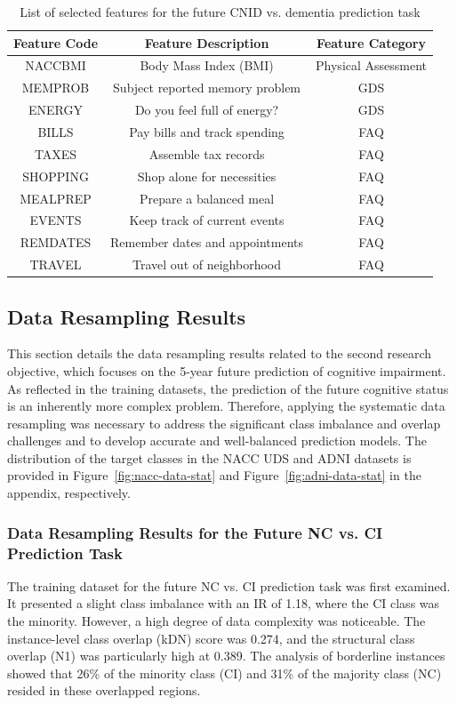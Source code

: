 \begin{table}[h!]
\centering
\caption{List of selected features for the future CNID vs. dementia prediction task}
\label{table:features-task4}
\begin{tabular}{ccc}
\toprule
\textbf{Feature Code} & \textbf{Feature Description} & \textbf{Feature Category} \\
\midrule
NACCBMI & Body Mass Index (\acrshort{BMI}) & Physical Assessment \\
MEMPROB & Subject reported memory problem & GDS \\
ENERGY & Do you feel full of energy? & GDS \\
BILLS & Pay bills and track spending & FAQ \\
TAXES & Assemble tax records & FAQ \\
SHOPPING & Shop alone for necessities & FAQ \\
MEALPREP & Prepare a balanced meal & FAQ \\
EVENTS & Keep track of current events & FAQ \\
REMDATES & Remember dates and appointments & FAQ \\
TRAVEL & Travel out of neighborhood & FAQ \\
\bottomrule
\end{tabular}
\end{table}


\subsection{Data Resampling Results}

\label{sec:resampling_results_ro2}
This section details the data resampling results related to the second research objective, which focuses on the 5-year future prediction of cognitive impairment. As reflected in the training datasets, the prediction of the future cognitive status is an inherently more complex problem. Therefore, applying the systematic data resampling was necessary to address the significant class imbalance and overlap challenges and to develop accurate and well-balanced prediction models. The distribution of the target classes in the NACC UDS and ADNI datasets is provided in Figure~\ref{fig:nacc-data-stat} and Figure~\ref{fig:adni-data-stat} in the appendix, respectively.

\subsubsection{Data Resampling Results for the Future NC vs. CI Prediction Task}
\label{sec:resampling_future_nc_ci}
The training dataset for the future NC vs. CI prediction task was first examined. It presented a slight class imbalance with an IR of 1.18, where the CI class was the minority. However, a high degree of data complexity was noticeable. The instance-level class overlap (kDN) score was 0.274, and the structural class overlap (N1) was particularly high at 0.389. The analysis of borderline instances showed that 26\% of the minority class (CI) and 31\% of the majority class (NC) resided in these overlapped regions.

